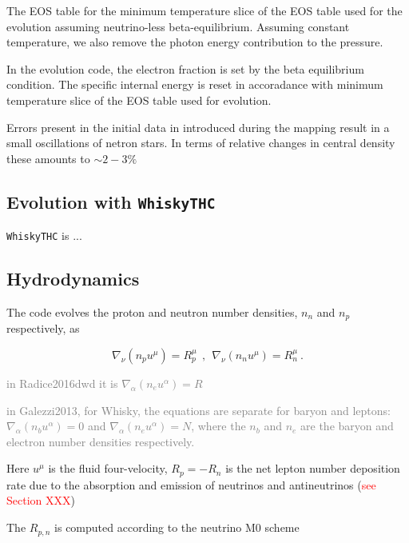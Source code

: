 \documentclass[11pt,a4paper,headinclude=true,DIV=14,BCOR=8mm,chapterprefix,listof=totoc,twoside,openright,abstracton]{scrbook}
\newcommand{\red}[1]{\textcolor{red}{#1}}
\newcommand{\gray}[1]{\textcolor{gray}{#1}}
\begin{document}
The EOS table for the minimum temperature slice of the EOS table used for the evolution assuming neutrino-less beta-equilibrium.
Assuming constant temperature, we also remove the photon energy contribution to the pressure.

In the evolution code, the electron fraction is set by the beta equilibrium condition. 
The specific internal energy is reset in accoradance with minimum temperature slice of the EOS table used for evolution.

Errors present in the initial data in introduced during the mapping result in a small oscillations of netron stars.
In terms of relative changes in central density these amounts to $\sim2-3\%$ \cite{Radice:2018pdn}


\subsection{Evolution with \texttt{WhiskyTHC}}


\texttt{WhiskyTHC} is ...
\cite{Radice:2012cu,Radice:2013xpa,Radice:2013hxh,Radice:2015nva}


\subsection{Hydrodynamics}

The code evolves the proton and neutron number densities, $n_n$ and $n_p$
respectively, as 

\begin{equation}
\label{eq:wthc:pndens}
\nabla_\nu (n_p u^\mu) = R_p^\mu \ \ , \ \ 
\nabla_\nu (n_n u^\mu) = R_n^\mu \ .
\end{equation}

\gray{in Radice2016dwd it is $\nabla_{\alpha}(n_e u^{\alpha}) = R$}

\gray{in Galezzi2013, for Whisky, the equations are separate for baryon and leptons: $\nabla_{\alpha}(n_bu^{\alpha})=0$ and $\nabla_{\alpha}(n_eu^{\alpha})=N$, where the $n_b$ and $n_e$ are the baryon and electron number densities respectively.}

Here $u^{\mu}$ is the fluid four-velocity, $R_p = -R_n$ is the net
lepton number deposition rate due to the absorption and emission of neutrinos 
and antineutrinos (\red{see Section XXX})

The $R_{p,n}$ is computed according to the neutrino M0 scheme \cite{Radice:2016dwd,Radice:2018pdn}
\end{document}
